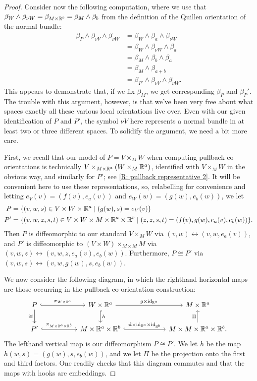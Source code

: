 \begin{proof}
	Consider now the following computation, where we use that $\beta_W \wedge \beta_{\nu W} = \beta_{M\times \mathbb{R}^b} = \beta_M \wedge \beta_b$ from the definition of the Quillen orientation of the normal bundle:
	\begin{align*}
		\beta_P \wedge \beta_{\nu V} \wedge \beta_{\nu W}& = \beta_W \wedge \beta_a \wedge \beta_{\nu W}\\
		& = \beta_W \wedge \beta_{\nu W} \wedge \beta_a\\
		& = \beta_M \wedge \beta_b \wedge \beta_a \\
		& = \beta_M \wedge \beta_{a+b}\\
		& = \beta_{P'} \wedge \beta_{\nu V} \wedge \beta_{\nu W}.
	\end{align*}
	This appears to demonstrate that, if we fix $\beta_M$, we get corresponding $\beta_P$ and $\beta_P'$.
	The trouble with this argument, however, is that we've been very free about what spaces exactly all these various local orientations live over.
	Even with our given identification of $P$ and $P'$, the symbol $\nu V$ here represents a normal bundle in at least two or three different spaces.
	To solidify the argument, we need a bit more care.

	First, we recall that our model of $P = V \times_M W$ when computing pullback co-orientations is technically $V \times_{M \times \mathbb{R}^a} (W \times_M \mathbb{R}^a)$, identified with $V \times_M W$ in the obvious way, and similarly for $P'$; see \cref{R: pullback representative 2}.
	It will be convenient here to use these representations, so, relabelling for convenience and letting $e_V(v) = (f(v),e_a(v))$ and $e_W(w) = (g(w),e_b(w))$, we let
	\begin{align*}
		P &= \{(v,w,s)\in V\times W\times \mathbb{R}^a\mid (g(w),s)=e_V(v)\}\\
		P' &= \{(v,w,z,s,t)\in V\times W\times M \times \mathbb{R}^a \times \mathbb{R}^b \mid (z,z,s,t)=(f(v),g(w),e_a(v),e_b(w))\}.
	\end{align*}
	Then $P$ is diffeomorphic to our standard $V \times_M W$ via $(v,w) \leftrightarrow (v,w,e_a(v))$, and $P'$ is diffeomorphic to $(V \times W) \times_{M \times M} M$ via $(v,w,z) \leftrightarrow (v,w,z,e_a(v),e_b(w))$. Furthermore, $P \cong P'$ via $(v,w,s)\leftrightarrow (v,w,g(w),s,e_b(w))$.

	We now consider the following diagram, in which the righthand horizontal maps are those occurring in the pullback co-orientation construction:
	\[
	\begin{tikzcd}
		P \arrow[r, hook, "\pi_{W \times \R^a}"] \arrow[d, "\cong" swap] &[1cm]
		W \times \R^a \arrow[r, "g \times \id_{\R^a}"] \arrow[d, hook, "h"] &[1.3cm]
		M \times \R^a \\
		P' \arrow[r, hook, "\pi_{M\times \R^a \times \R^b}"] &
		M \times \R^a \times \R^b \arrow[r, hook, "\diag \times \id_{\R^a} \times \id_{\R^b}"] &
		M \times M \times \R^a \times \R^b. \arrow[u, "\Pi"]
	\end{tikzcd}
	\]
	The lefthand vertical map is our diffeomorphism $P \cong P'$. We let $h$ be the map $h(w,s) = (g(w),s,e_b(w))$, and we let $\Pi$ be the projection onto the first and third factors.
	One readily checks that this diagram commutes and that the maps with hooks are embeddings.


\end{proof}
